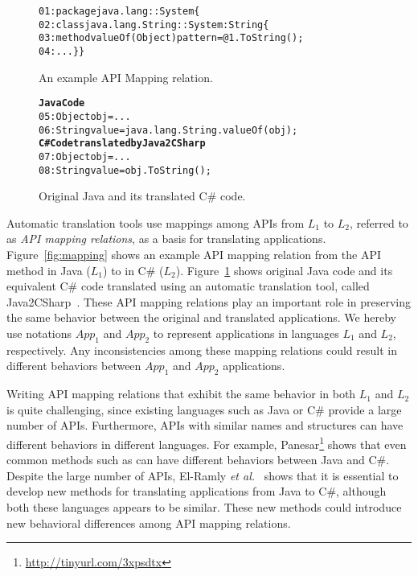 \begin{figure}[t]
\begin{CodeOut}%
\begin{alltt}
01: package java.lang::System\{
02:   class java.lang.String :: System:String\{
03:   method valueOf(Object) { pattern = @1.ToString(); }
04:   ...\}\}
\end{alltt}
\end{CodeOut}\vspace*{-4ex}
\caption{\label{fig:mapping} An example API Mapping relation.}\vspace*{-2ex}
\begin{CodeOut}%
\begin{alltt}
\textbf{Java Code}
05:  Object obj = ...
06:  String value = java.lang.String.valueOf(obj);
\textbf{C# Code translated by Java2CSharp}
07:  Object obj = ...
08:  String value = obj.ToString();
\end{alltt}
\end{CodeOut}\vspace*{-4ex}
\caption{\label{fig:transcode}Original Java and its translated C\# code.}\vspace*{-4ex}
\end{figure}

Automatic translation tools use mappings among APIs from $L_1$ to $L_2$, referred to as \emph{API mapping relations}, as a basis for translating applications. Figure~\ref{fig:mapping} shows an example API mapping relation from the API method  in Java ($L_1$) to  in C\# ($L_2$). Figure~\ref{fig:transcode} shows original Java code and its equivalent C\# code translated using an automatic translation tool, called Java2CSharp~\cite{Java2CSharp}. These API mapping relations play an important role in preserving the same behavior between the original and translated applications. We hereby use notations $App_1$ and $App_2$ to represent applications in languages $L_1$ and $L_2$, respectively. Any inconsistencies among these mapping relations could result in different behaviors between $App_1$ and $App_2$ applications.

Writing API mapping relations that exhibit the same behavior in both $L_1$ and $L_2$ is quite challenging, since existing languages such as Java or C\# provide a large number of APIs. Furthermore, APIs with similar names and structures can have different behaviors in different languages. For example, Panesar\footnote{\url{http://tinyurl.com/3xpsdtx}} shows that even common methods such as  can have different behaviors between Java and C\#. Despite the large number of APIs, El-Ramly \emph{et al.}~\cite{el2006experiment} shows that it is essential to develop new methods for translating applications from Java to C\#, although both these languages appears to be similar. These new methods could introduce new behavioral differences among API mapping relations. 

